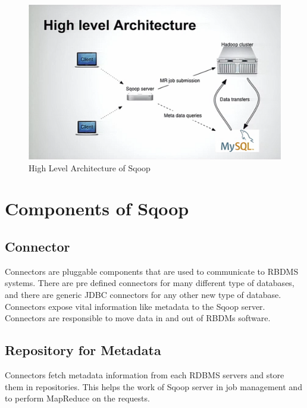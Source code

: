 \documentclass[9pt,twocolumn,twoside]{styles/osajnl}
\begin{document}
\begin{figure}[htbp]
\centering
\includegraphics[width=\linewidth]{images/archi.png}
\caption{High Level Architecture of Sqoop \cite{sqoop-blog}}
\label{fig:archi}
\end{figure}


\section{Components of Sqoop}
\subsection{Connector}
Connectors are pluggable components that are used to communicate to RBDMS systems. There are pre defined connectors for many different type of databases, and there are generic JDBC connectors for any other new type of database. Connectors expose vital information like metadata to the Sqoop server. Connectors are responsible to move data in and out of RBDMs software. 
\subsection{Repository for Metadata}
Connectors fetch metadata information from each RDBMS servers and store them in repositories. This helps the work of Sqoop server in job management and to perform MapReduce on the requests.
\end{document}
